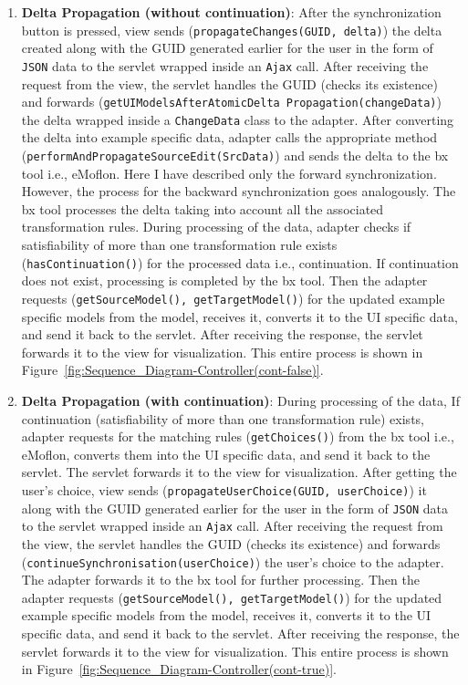 \begin{enumerate}
	\item {\textbf{Delta Propagation (without continuation)}: After the synchronization button is pressed, view sends (\texttt{propagateChanges(GUID, delta)}) the delta created along with the GUID generated earlier for the user in the form of \texttt{JSON} data to the servlet wrapped inside an \texttt{Ajax} call. After receiving the request from the view, the servlet handles the GUID (checks its existence) and forwards (\texttt{getUIModelsAfterAtomicDelta Propagation(changeData)}) the delta wrapped inside a \texttt{ChangeData} class to the adapter. After converting the delta into example specific data, adapter calls the appropriate method (\texttt{performAndPropagateSourceEdit(SrcData)}) and sends the delta to the bx tool i.e., eMoflon. Here I have described only the forward synchronization. However, the process for the backward synchronization goes analogously. The bx tool processes the delta taking into account all the associated transformation rules. During processing of the data, adapter checks if satisfiability of more than one transformation rule exists (\texttt{hasContinuation()}) for the processed data i.e., continuation. If continuation does not exist, processing is completed by the bx tool. Then the adapter requests (\texttt{getSourceModel(), getTargetModel()}) for the updated example specific models from the model, receives it, converts it to the UI specific data, and send it back to the servlet. After receiving the response, the servlet forwards it to the view for visualization. This entire process is shown in Figure~\ref{fig:Sequence_Diagram-Controller(cont-false)}.}
	
	\item {\textbf{Delta Propagation (with continuation)}: During processing of the data, If continuation (satisfiability of more than one transformation rule) exists, adapter requests for the matching rules (\texttt{getChoices()}) from the bx tool i.e., eMoflon, converts them into the UI specific data, and send it back to the servlet. The servlet forwards it to the view for visualization. After getting the user's choice, view sends (\texttt{propagateUserChoice(GUID, userChoice)}) it along with the GUID generated earlier for the user in the form of \texttt{JSON} data to the servlet wrapped inside an \texttt{Ajax} call. After receiving the request from the view, the servlet handles the GUID (checks its existence) and forwards (\texttt{continueSynchronisation(userChoice)}) the user's choice to the adapter. The adapter forwards it to the bx tool for further processing. Then the adapter requests (\texttt{getSourceModel(), getTargetModel()}) for the updated example specific models from the model, receives it, converts it to the UI specific data, and send it back to the servlet. After receiving the response, the servlet forwards it to the view for visualization. This entire process is shown in Figure~\ref{fig:Sequence_Diagram-Controller(cont-true)}.}
\end{enumerate}

